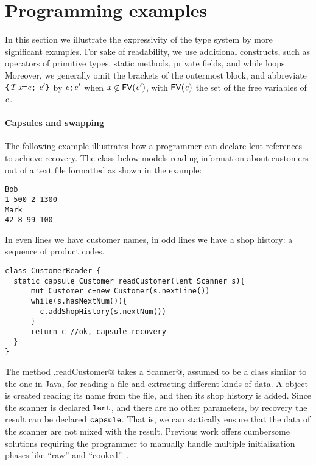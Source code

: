 \section{Programming examples}\label{sect:examples}

In this section we illustrate the {expressivity of the type system by more significant} examples. 
For sake of readability, we use additional constructs, such as {operators of} primitive types, static methods{, private fields,} and while loops. Moreover, we generally omit the
brackets of the outermost block, and abbreviate $\texttt{\{}\mathit{T}\,\mathit{x}\texttt{=}\mathit{e}\texttt{;}\ \mathit{e}'\texttt{\}}$ by $\mathit{e}\texttt{;} \mathit{e}'$ when $\mathit{x}\not\in\textsf{FV}(\mathit{e}')$, with $\textsf{FV}(\mathit{e})$ the set of the free variables
 of $\mathit{e}$. 
  
\paragraph{Capsules and swapping}
{The following example illustrates} how a programmer can declare lent references to achieve {recovery}.
The class \Q@CustomerReader@ below models reading information about customers out of a text file formatted as shown in the example:

\begin{lstlisting}
Bob
1 500 2 1300
Mark
42 8 99 100
\end{lstlisting}

In even lines we have customer names, in odd lines we have a shop history: a sequence of product codes.

\begin{lstlisting}
class CustomerReader {
  static capsule Customer readCustomer(lent Scanner s){
      mut Customer c=new Customer(s.nextLine())
      while(s.hasNextNum()){
        c.addShopHistory(s.nextNum())
      }
      return c //ok, capsule recovery
  }
}
\end{lstlisting}
The method \Q@CustomerReader.readCustomer@ takes a \Q@lent Scanner@, assumed to be a class similar to the one in Java,
for reading a file and extracting different kinds of data.
A \Q@Customer@ object is {created reading its name} from the file, and then its shop history is added.
Since the scanner is declared $\texttt{lent}$, and there are no other parameters, by  {recovery} the result can be declared $\texttt{capsule}$. {That is, we can statically ensure that the data of the scanner are not mixed with the result.}
Previous work offers cumbersome solutions requiring the programmer to manually handle multiple initialization phases like ``raw'' and ``cooked''~\cite{ZibinEtAl10}.

